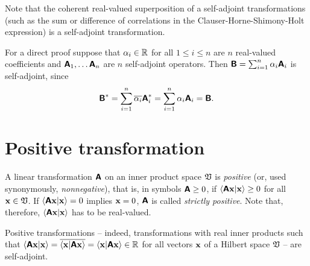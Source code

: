 Note that the coherent real-valued superposition
of a self-adjoint transformations
(such as the sum or difference of correlations in
the Clauser-Horne-Shimony-Holt expression\cite{filipp-svo-04-qpoly-prl})
is a self-adjoint transformation.

{\color{OliveGreen}\bproof
For a direct proof
suppose that $\alpha_i \in {\Bbb R}$ for all $1\le i \le n$ are $n$ real-valued coefficients and
$\textsf{\textbf{A}}_1, \ldots \textsf{\textbf{A}}_n$ are $n$ self-adjoint operators.
Then
$\textsf{\textbf{B}} = \sum_{i=1}^n \alpha_i \textsf{\textbf{A}}_i$
is self-adjoint, since
\begin{equation}
\textsf{\textbf{B}}^\ast  = \sum_{i=1}^n \overline{\alpha_i} \textsf{\textbf{A}}_i^\ast  = \sum_{i=1}^n  \alpha_i  \textsf{\textbf{A}}_i
=\textsf{\textbf{B}}
.
\end{equation}
\eproof
}

\section{Positive transformation}
\label{2015-m-ch-fdlvs-positive}

A linear transformation  $\textsf{\textbf{A}}$ on an inner product space ${\frak V}$ is {\em positive}
(or, used synonymously, {\em nonnegative}),
that is, in symbols $\textsf{\textbf{A}}\ge 0$,
if $\langle \textsf{\textbf{A}}{\bf x}\vert {\bf x}\rangle  \ge 0$
for all ${\bf x}\in {\frak V}$.
If  $\langle \textsf{\textbf{A}}{\bf x}\vert {\bf x}\rangle = 0$ implies
${\bf x}=0$, $\textsf{\textbf{A}}$ is called {\em strictly positive}.
Note that, therefore, $\langle \textsf{\textbf{A}}{\bf x}\vert {\bf x}\rangle$
has to be real-valued.


Positive transformations -- indeed, transformations with real inner products such that
$
\langle \textsf{\textbf{A}} {\bf x}\vert {\bf x}\rangle
= \overline{\langle {\bf x}\vert \textsf{\textbf{A}}{\bf x}\rangle }
=
\langle {\bf x}\vert \textsf{\textbf{A}}{\bf x}\rangle \in \mathbb{R}$
for all vectors  ${\bf x}$
of a Hilbert space ${\frak V}$ --
are self-adjoint.

